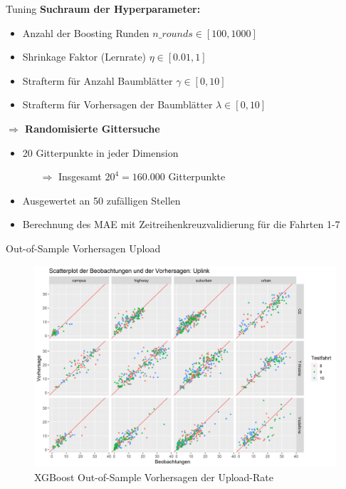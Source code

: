 \begin{frame}{Tuning}
    \textbf{Suchraum der Hyperparameter:}
    \begin{itemize}
        \item Anzahl der Boosting Runden $n\_rounds \in [100, 1000]$
        \item \glqq Shrinkage \grqq{} Faktor (Lernrate) $\eta \in [0.01, 1]$
        \item Strafterm f\"ur Anzahl Baumbl\"atter $\gamma \in [0, 10]$
        \item Strafterm f\"ur Vorhersagen der Baumbl\"atter $\lambda \in [0, 10]$
    \end{itemize}
    \textbf{$\Rightarrow$ Randomisierte Gittersuche}
    \begin{itemize}
        \item 20 Gitterpunkte in jeder Dimension
        \begin{itemize}
            \item[$\Rightarrow$] Insgesamt $20^4 = 160.000$ Gitterpunkte
        \end{itemize}
        \item Ausgewertet an 50 zuf\"alligen Stellen
        \item Berechnung des MAE mit Zeitreihenkreuzvalidierung f\"ur die Fahrten 1-7
    \end{itemize}
\end{frame}

\begin{frame}{Out-of-Sample Vorhersagen Upload}
    \begin{figure}[h]
        \centering
        \includegraphics[scale=0.33]{plots/xgboost/uplink/scatter_colored_axes_fixed}
        \caption{XGBoost Out-of-Sample Vorhersagen der Upload-Rate}
        \label{xgboost_scatter_colored_uplink}
    \end{figure}
\end{frame}

